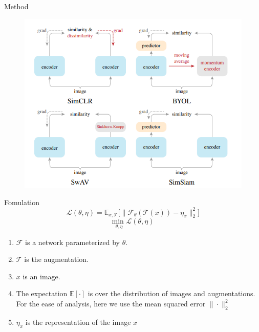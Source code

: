 \documentclass{beamer}
\begin{document}
	\begin{frame}{Method}
		\begin{figure}
			\centering
			\includegraphics[scale=0.5]{method.png}
		\end{figure}
	\end{frame}
	
	\begin{frame}[t]{Fomulation}
		$$\mathcal{L}(\theta, \eta) = \mathbb{E}_{x, \mathcal{T}}\Big[\|\mathcal{F}_\theta(\mathcal{T}(x)) - \eta_x\|_2^2\Big]$$
		$$\underset{\theta, \eta}{\text{min }} \mathcal{L}(\theta, \eta)$$
		\begin{enumerate}
			\item $\mathcal{F}$ is a network parameterized by $\theta$.
			\item $\mathcal{T}$ is the augmentation.
			\item $x$ is an image.
			\item The expectation $\mathbb{E}[\cdot]$ is over the distribution
			of images and augmentations. For the ease of analysis, here
			we use the mean squared error $\|\cdot\|^2_2$
			\item $\eta_x$ is the representation of the image $x$

		\end{enumerate}
	\end{frame}
\end{document}
